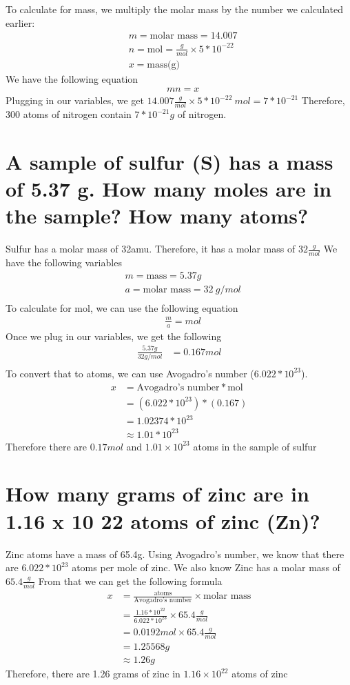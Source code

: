 \documentclass{scrartcl}
\begin{document}
To calculate for mass, we multiply the molar mass by the number we calculated
earlier:
\begin{align*}
&m=\text{molar mass}=14.007\\
&n=\text{mol}=\frac{g}{mol}\times5*10^{-22}\\
&x=\text{mass(g)}
\end{align*}
We have the following equation
\begin{align*}
&mn=x
\end{align*}
Plugging in our variables, we get
\(14.007 \frac{g}{mol}\times5*10^{-22}\ mol=7*10^{-21}\)
Therefore, 300 atoms of nitrogen contain \(7*10^{-21}g\) of nitrogen.

\section{A sample of sulfur (S) has a mass of 5.37 g. How many moles are in the sample? How many atoms?}
\label{sec:orgba7f43f}
Sulfur has a molar mass of 32amu. Therefore, it has a molar mass of
\(32\frac{g}{mol}\)
We have the following variables
\begin{align*}
&m=\text{mass}=5.37g\\
&a=\text{molar mass}=32\ g/mol\\
\end{align*}
To calculate for mol, we can use the following equation
\begin{align*}
&\frac{m}{a}=mol
\end{align*}
Once we plug in our variables, we get the following
\begin{align*}
\frac{5.37g}{32g/mol}&=0.167mol\\
\end{align*}
To convert that to atoms, we can use Avogadro's number (\(6.022 *10^{23}\)).
\begin{align*}
x&=\text{Avogadro's number}*\text{mol}\\
&=(6.022*10^{23})*(0.167)\\
&=1.02374*10^{23}\\
&\approx1.01*10^{23}
\end{align*}
Therefore there are \(0.17mol\) and \(1.01\times10^{23}\) atoms in the sample of sulfur

\section{How many grams of zinc are in 1.16 x 10 22 atoms of zinc (Zn)?}
\label{sec:org4c6dfb5}
Zinc atoms have a mass of 65.4g. Using Avogadro's number, we know that there are \(6.022 *10^{23}\) atoms per mole of zinc.
We also know Zinc has a molar mass of \(65.4\frac{g}{mol}\)
From that we can get the following formula
\begin{align*}
x&=\frac{\text{atoms}}{\text{Avogadro's number}}\times\text{molar mass}\\
&=\frac{1.16*10^{22}}{6.022*10^{23}}\times65.4 \frac{g}{mol}\\
&=0.0192mol\times65.4\frac{g}{mol}\\
&=1.25568g\\
&\approx1.26g
\end{align*}
Therefore, there are 1.26 grams of zinc in \(1.16\times10^{22}\) atoms  of zinc
\end{document}
